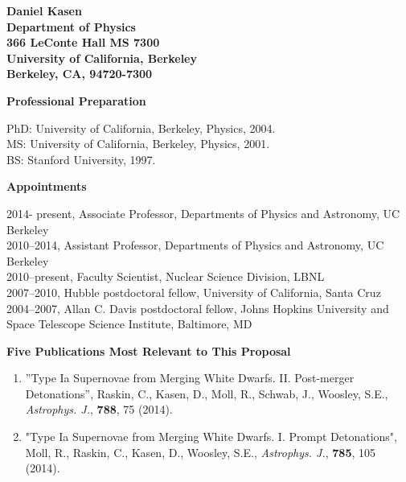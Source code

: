 \documentclass[11pt,letterpaper,english]{article}
\begin{document}
\setlength{\parindent}{0in} %

\pagestyle{fancy}   \renewcommand{%
\headrulewidth}{0.0pt}



\centering 
{\bf Daniel Kasen}\\
{\bf Department of Physics  \\
  366 LeConte Hall MS 7300 \\
  University of California, Berkeley \\
  Berkeley, CA, 94720-7300
} \smallskip

\begin{flushleft} {\bf Professional Preparation}
{\parindent 16pt

PhD: University of California, Berkeley, Physics,  2004.\\ 
MS: University of California, Berkeley, Physics,  2001.\\ 
BS: Stanford University, 1997. \\
}

\vspace{.04in}
{\bf Appointments}
{\parindent 16pt

2014- present, Associate Professor, Departments of Physics and Astronomy, UC Berkeley \\
2010--2014, Assistant Professor, Departments of Physics and Astronomy, UC Berkeley \\
2010--present, Faculty Scientist, Nuclear Science Division, LBNL \\
2007--2010, Hubble postdoctoral fellow, University of California, Santa Cruz \\
2004--2007, Allan C. Davis postdoctoral fellow, Johns Hopkins University and Space Telescope Science Institute, Baltimore, MD \\
}

\vspace{.04in}
{\bf Five Publications Most Relevant to This Proposal}
\vspace{-6pt}
\begin{enumerate} \itemsep1pt \parskip0pt 

\item ''Type Ia Supernovae from Merging White Dwarfs. II. Post-merger Detonations'', Raskin, C., Kasen, D., 
Moll, R., Schwab, J., Woosley, S.E., \emph{Astrophys. J.}, {\bf 788}, 75 (2014).

\item "Type Ia Supernovae from Merging White Dwarfs. I. Prompt Detonations", 
Moll, R., Raskin, C., Kasen, D.,  Woosley, S.E., \emph{Astrophys. J.}, {\bf 785}, 105 (2014).


\end{enumerate}
\end{flushleft}
\end{document}
